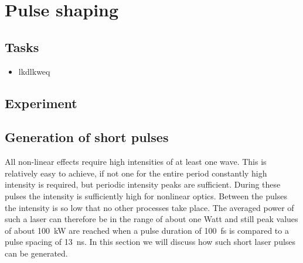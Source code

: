 \renewcommand{\lastmod}{May 7, 2020}
\chapter{Pulse shaping}


\section{Tasks}

\begin{itemize}
\item lkdlkweq
\end{itemize}

\section{Experiment}



\section{Generation of short pulses}


All non-linear effects  require high
intensities of at least one wave. This 
is relatively
easy to achieve, if not one for the entire period
constantly high intensity is required, but periodic
intensity peaks are sufficient. During these pulses the
intensity  is sufficiently high for nonlinear optics. Between the pulses 
the intensity is so low that no other processes take place. The averaged power of such a laser can therefore
be in the range of about one Watt and still 
peak values of about 100~kW are reached when a pulse duration of
100~fs is compared to a pulse spacing of 13~ns. In
this section we will discuss how such short
laser pulses can be generated.


